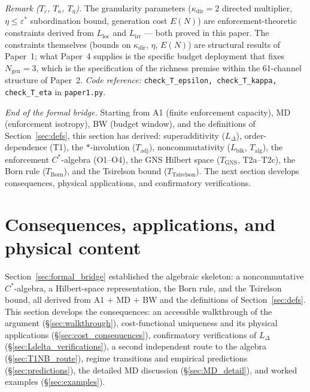 \documentclass[11pt]{article}
\theoremstyle{remark}
\newcommand{\coderef}[2]{\smallskip\noindent\textit{Code reference:} \texttt{#1} in \texttt{#2}.}
\begin{document}
\smallskip\noindent\textit{Remark ($T_\varepsilon$, $T_\kappa$, $T_\eta$).}  The granularity parameters ($\kappa_{\mathrm{dir}} = 2$ directed multiplier, $\eta \le \varepsilon^*$ subordination bound, generation cost $E(N)$) are enforcement-theoretic constraints derived from $L_{\mathrm{loc}}$ and $L_{\mathrm{irr}}$ --- both proved in this paper.  The constraints themselves (bounds on $\kappa_{\mathrm{dir}}$, $\eta$, $E(N)$) are structural results of Paper~1; what Paper~4 supplies is the specific budget deployment that fixes $N_{\mathrm{gen}} = 3$, which is the specification of the richness premise within the 61-channel structure of Paper~2.  \coderef{check\_T\_epsilon, check\_T\_kappa, check\_T\_eta}{paper1.py}





\medskip\noindent\textit{End of the formal bridge.}  Starting from A1 (finite enforcement capacity), MD (enforcement isotropy), BW (budget window), and the definitions of Section~\ref{sec:defs}, this section has derived: superadditivity ($L_\Delta$), order-dependence (T1), the $*$-involution ($T_{\mathrm{adj}}$), noncommutativity ($L_{\mathrm{blk}}$, $T_{\mathrm{alg}}$), the enforcement $C^*$-algebra (O1--O4), the GNS Hilbert space ($T_{\mathrm{GNS}}$, T2a--T2c), the Born rule ($T_{\mathrm{Born}}$), and the Tsirelson bound ($T_{\mathrm{Tsirelson}}$).  The next section develops consequences, physical applications, and confirmatory verifications.


\section{Consequences, applications, and physical content}
\label{sec:consequences}

\noindent Section~\ref{sec:formal_bridge} established the algebraic skeleton: a noncommutative $C^*$-algebra, a Hilbert-space representation, the Born rule, and the Tsirelson bound, all derived from A1 + MD + BW and the definitions of Section~\ref{sec:defs}.  This section develops the consequences: an accessible walkthrough of the argument (\S\ref{sec:walkthrough}), cost-functional uniqueness and its physical applications (\S\ref{sec:cost_consequences}), confirmatory verifications of $L_\Delta$ (\S\ref{sec:Ldelta_verifications}), a second independent route to the algebra (\S\ref{sec:T1NB_route}), regime transitions and empirical predictions (\S\ref{sec:predictions}), the detailed MD discussion (\S\ref{sec:MD_detail}), and worked examples (\S\ref{sec:examples}).
\end{document}
